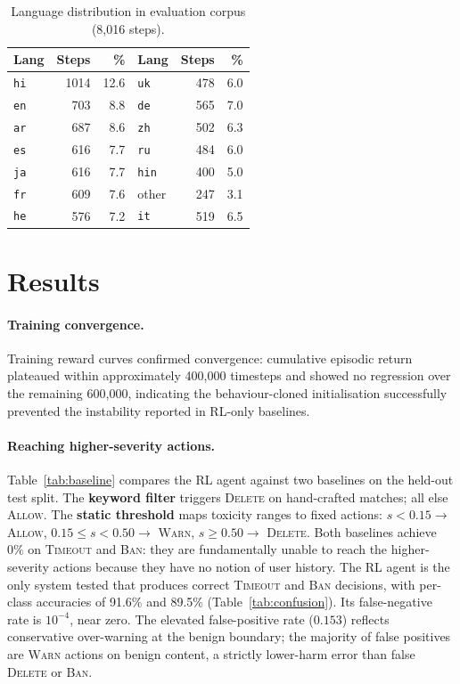 \documentclass{article}
\begin{document}
\begin{table}[t]
  \caption{Language distribution in evaluation corpus (8,016 steps).}
  \label{tab:lang_dist}
  \centering
  \begin{tabular}{lrr|lrr}
    \toprule
    Lang & Steps & \% & Lang & Steps & \% \\
    \midrule
    \texttt{hi}  & 1014 & 12.6 & \texttt{uk}  &  478 & 6.0 \\
    \texttt{en}  &  703 &  8.8 & \texttt{de}  &  565 & 7.0 \\
    \texttt{ar}  &  687 &  8.6 & \texttt{zh}  &  502 & 6.3 \\
    \texttt{es}  &  616 &  7.7 & \texttt{ru}  &  484 & 6.0 \\
    \texttt{ja}  &  616 &  7.7 & \texttt{hin} &  400 & 5.0 \\
    \texttt{fr}  &  609 &  7.6 & other        &  247 & 3.1 \\
    \texttt{he}  &  576 &  7.2 & \texttt{it}  &  519 & 6.5 \\
    \bottomrule
  \end{tabular}
\end{table}


\section{Results}
\label{sec:results}

\paragraph{Training convergence.}
Training reward curves confirmed convergence: cumulative episodic return
plateaued within approximately 400{,}000 timesteps and showed no regression over
the remaining 600{,}000, indicating the behaviour-cloned initialisation
successfully prevented the instability reported in RL-only baselines.

\paragraph{Reaching higher-severity actions.}
Table~\ref{tab:baseline} compares the RL agent against two baselines on the
held-out test split. The \textbf{keyword filter} triggers \textsc{Delete} on
hand-crafted matches; all else \textsc{Allow}. The \textbf{static threshold}
maps toxicity ranges to fixed actions: $s < 0.15 \to$ \textsc{Allow},
$0.15 \leq s < 0.50 \to$ \textsc{Warn}, $s \geq 0.50 \to$ \textsc{Delete}.
Both baselines achieve $0\%$ on \textsc{Timeout} and \textsc{Ban}: they are
fundamentally unable to reach the higher-severity actions because they have no
notion of user history. The RL agent is the only system tested that produces
correct \textsc{Timeout} and \textsc{Ban} decisions, with per-class accuracies
of 91.6\% and 89.5\% (Table~\ref{tab:confusion}). Its false-negative rate is
$10^{-4}$, near zero. The elevated false-positive rate ($0.153$) reflects
conservative over-warning at the benign boundary; the majority of false
positives are \textsc{Warn} actions on benign content, a strictly lower-harm
error than false \textsc{Delete} or \textsc{Ban}.
\end{document}
